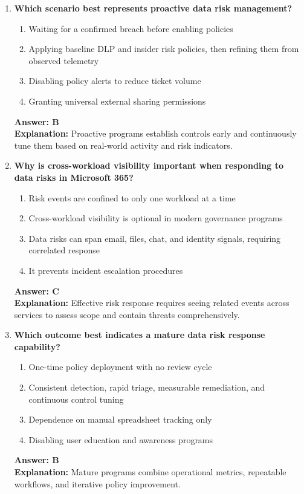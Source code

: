 \documentclass[10pt]{article}
\begin{document}
\begin{enumerate}[leftmargin=*]
\item \textbf{Which scenario best represents proactive data risk management?}
\begin{enumerate}[label=\Alph*.]
  \item Waiting for a confirmed breach before enabling policies
  \item Applying baseline DLP and insider risk policies, then refining them from observed telemetry
  \item Disabling policy alerts to reduce ticket volume
  \item Granting universal external sharing permissions
\end{enumerate}
\textbf{Answer: B}\\
\textbf{Explanation:} Proactive programs establish controls early and continuously tune them based on real-world activity and risk indicators.

\item \textbf{Why is cross-workload visibility important when responding to data risks in Microsoft 365?}
\begin{enumerate}[label=\Alph*.]
  \item Risk events are confined to only one workload at a time
  \item Cross-workload visibility is optional in modern governance programs
  \item Data risks can span email, files, chat, and identity signals, requiring correlated response
  \item It prevents incident escalation procedures
\end{enumerate}
\textbf{Answer: C}\\
\textbf{Explanation:} Effective risk response requires seeing related events across services to assess scope and contain threats comprehensively.

\item \textbf{Which outcome best indicates a mature data risk response capability?}
\begin{enumerate}[label=\Alph*.]
  \item One-time policy deployment with no review cycle
  \item Consistent detection, rapid triage, measurable remediation, and continuous control tuning
  \item Dependence on manual spreadsheet tracking only
  \item Disabling user education and awareness programs
\end{enumerate}
\textbf{Answer: B}\\
\textbf{Explanation:} Mature programs combine operational metrics, repeatable workflows, and iterative policy improvement.


\end{enumerate}
\end{document}
